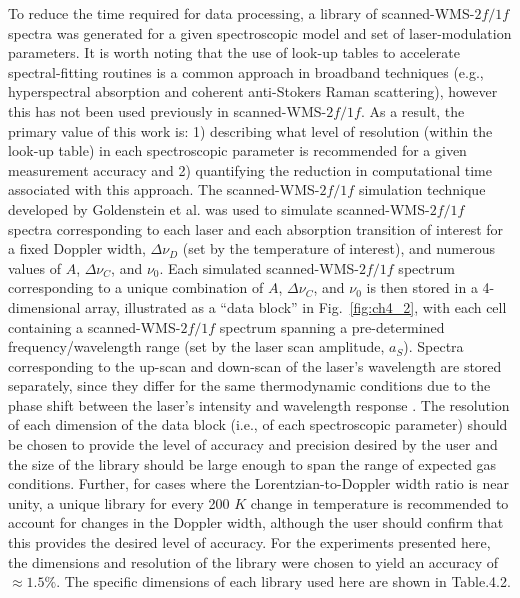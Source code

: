 To reduce the time required for data processing, a library of scanned-WMS-$2f/1f$ spectra was generated for a given spectroscopic model and set of laser-modulation parameters. It is worth noting that the use of look-up tables to accelerate spectral-fitting routines is a common approach in broadband techniques (e.g., hyperspectral absorption and coherent anti-Stokers Raman scattering), however this has not been used previously in scanned-WMS-$2f/1f$. As a result, the primary value of this work is: 1) describing what level of resolution (within the look-up table) in each spectroscopic parameter is recommended for a given measurement accuracy and 2) quantifying the reduction in computational time associated with this approach. The scanned-WMS-$2f/1f$ simulation technique developed by Goldenstein et al. \cite{Goldenstein2014} was used to simulate scanned-WMS-$2f/1f$ spectra corresponding to each laser and each absorption transition of interest for a fixed Doppler width, $\Delta\nu_D$ (set by the temperature of interest), and numerous values of $A$, $\Delta\nu_C$, and $\nu_0$. Each simulated scanned-WMS-$2f/1f$ spectrum corresponding to a unique combination of $A$, $\Delta\nu_C$, and $\nu_0$ is then stored in a 4-dimensional array, illustrated as a “data block” in Fig.\ \ref{fig:ch4_2}, with each cell containing a scanned-WMS-$2f/1f$ spectrum spanning a pre-determined frequency/wavelength range (set by the laser scan amplitude, $a_S$). Spectra corresponding to the up-scan and down-scan of the laser’s wavelength are stored separately, since they differ for the same thermodynamic conditions due to the phase shift between the laser's intensity and wavelength response \cite{Goldenstein2014}. The resolution of each dimension of the data block (i.e., of each spectroscopic parameter) should be chosen to provide the level of accuracy and precision desired by the user and the size of the library should be large enough to span the range of expected gas conditions. Further, for cases where the Lorentzian-to-Doppler width ratio is near unity, a unique library for every 200 $K$ change in temperature is recommended to account for changes in the Doppler width, although the user should confirm that this provides the desired level of accuracy. For the experiments presented here, the dimensions and resolution of the library were chosen to yield an accuracy of $\approx 1.5\%$. The specific dimensions of each library used here are shown in Table.4.2.

